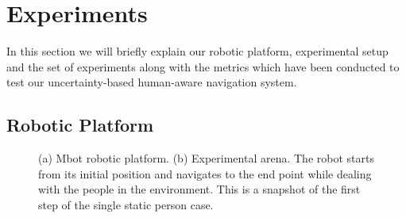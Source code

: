 \section{Experiments}
\label{sec:experimental_setup}
In this section we will briefly explain our robotic platform, experimental setup and the set of experiments along with the metrics which have been conducted to test our uncertainty-based human-aware navigation system.

\subsection{Robotic Platform}
\label{sec:robot}

\begin{figure}[t!]
\centering
{}%
\hspace{0.1cm}
%
\hspace{0.1cm}

\caption{(a) Mbot robotic platform. (b) Experimental arena. The robot starts from its initial position and navigates to the end point while dealing with the people in the environment. This is a snapshot of the first step of the single static person case.}
\label{fig:setup}
\end{figure}




